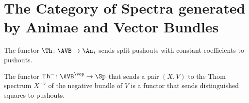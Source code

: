 \section{The Category of Spectra generated by Animae and Vector Bundles}\label{section:spectraGenerated}


\begin{definition}

\end{definition}

\begin{lemma}
    The functor $\Th \colon \AVB \to \An_*$ sends split pushouts with constant coefficients to pushouts.    
\end{lemma}

\begin{proposition}
    The functor $\mathrm{Th}^- \colon \AVB^\vop \to \Sp$ that sends a pair $(X,V)$ to the 
    Thom spectrum $X^{-V}$ of the negative bundle of $V$ is a functor that sends distinguished squares to pushouts.
\end{proposition}

